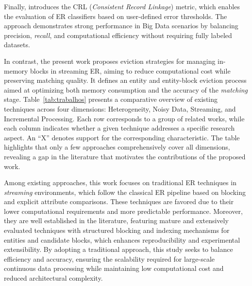 \documentclass{ieeeaccess}
\begin{document}
Finally, \cite{10.1145/3786768} introduces the CRL (\textit{Consistent Record Linkage}) metric, which enables the evaluation of ER classifiers based on user-defined error thresholds. The approach demonstrates strong performance in Big Data scenarios by balancing precision, \textit{recall}, and computational efficiency without requiring fully labeled datasets.

In contrast, the present work proposes eviction strategies for managing in-memory blocks in streaming ER, aiming to reduce computational cost while preserving matching quality. It defines an entity and entity-block eviction process aimed at optimizing both memory consumption and the accuracy of the \textit{matching} stage. Table~\ref{tab:trabalhos} presents a comparative overview of existing techniques across four dimensions: Heterogeneity, Noisy Data, Streaming, and Incremental Processing. Each row corresponds to a group of related works, while each column indicates whether a given technique addresses a specific research aspect. An “X” denotes support for the corresponding characteristic. The table highlights that only a few approaches comprehensively cover all dimensions, revealing a gap in the literature that motivates the contributions of the proposed work.

Among existing approaches, this work focuses on traditional ER techniques in \textit{streaming} environments, which follow the classical ER pipeline based on blocking and explicit attribute comparisons. These techniques are favored due to their lower computational requirements and more predictable performance. Moreover, they are well established in the literature, featuring mature and extensively evaluated techniques with structured blocking and indexing mechanisms for entities and candidate blocks, which enhances reproducibility and experimental extensibility. By adopting a traditional approach, this study seeks to balance efficiency and accuracy, ensuring the scalability required for large-scale continuous data processing while maintaining low computational cost and reduced architectural complexity.
\end{document}
